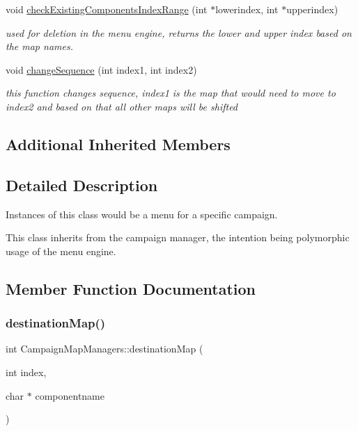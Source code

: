 \begin{DoxyCompactItemize}
\hypertarget{class_campaign_map_managers_a16313d7f353d1925c3341201b9600846}{}\label{class_campaign_map_managers_a16313d7f353d1925c3341201b9600846} 
void \hyperlink{class_campaign_map_managers_a16313d7f353d1925c3341201b9600846}{check\+Existing\+Components\+Index\+Range} (int $\ast$lowerindex, int $\ast$upperindex)
\begin{DoxyCompactList}\small\item\em used for deletion in the menu engine, returns the lower and upper index based on the map names. \end{DoxyCompactList}\item 
\hypertarget{class_campaign_map_managers_a5935b7ed9d63ff44d748f7860c3eceb1}{}\label{class_campaign_map_managers_a5935b7ed9d63ff44d748f7860c3eceb1} 
void \hyperlink{class_campaign_map_managers_a5935b7ed9d63ff44d748f7860c3eceb1}{change\+Sequence} (int index1, int index2)
\begin{DoxyCompactList}\small\item\em this function changes sequence, index1 is the map that would need to move to index2 and based on that all other maps will be shifted \end{DoxyCompactList}\end{DoxyCompactItemize}
\subsection*{Additional Inherited Members}


\subsection{Detailed Description}
Instances of this class would be a menu for a specific campaign. 

This class inherits from the campaign manager, the intention being polymorphic usage of the menu engine. 

\subsection{Member Function Documentation}
\hypertarget{class_campaign_map_managers_a7136317d7a94280b0a0b2a3f69b18182}{}\label{class_campaign_map_managers_a7136317d7a94280b0a0b2a3f69b18182} 
\subsubsection{\texorpdfstring{destination\+Map()}{destinationMap()}}
{\footnotesize\ttfamily int Campaign\+Map\+Managers\+::destination\+Map (\begin{DoxyParamCaption}\item[{int}]{index,  }\item[{char $\ast$}]{componentname }\end{DoxyParamCaption})\hspace{0.3cm}{\ttfamily [virtual]}}

